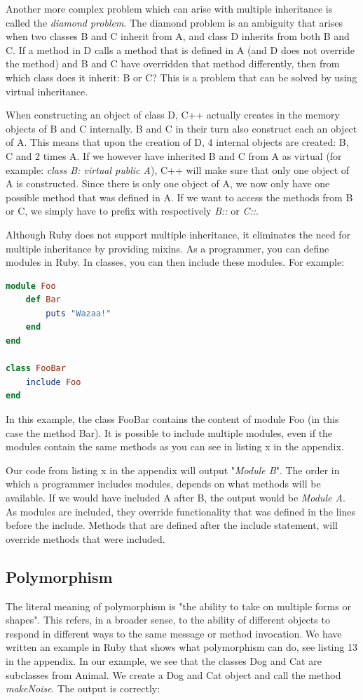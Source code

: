 \documentclass[10pt,a4paper,twocolumn]{article}
\begin{document}
Another more complex problem which can arise with multiple inheritance is called the \textit{diamond problem}. The diamond problem is an ambiguity that arises when two classes B and C inherit from A, and class D inherits from both B and C. If a method in D calls a method that is defined in A (and D does not override the method) and B and C have overridden that method differently, then from which class does it inherit: B or C? This is a problem that can be solved by using virtual inheritance.

When constructing an object of class D, C++ actually creates in the memory objects of B and C internally. B and C in their turn also construct each an object of A. This means that upon the creation of D, 4 internal objects are created: B, C and 2 times A. If we however have inherited B and C from A as virtual (for example: \textit{class B: virtual public A}), C++ will make sure that only one object of A is constructed. Since there is only one object of A, we now only have one possible method that was defined in A. If we want to access the methods from B or C, we simply have to prefix with respectively \textit{B::} or \textit{C::}.

Although Ruby does not support multiple inheritance, it eliminates the need for multiple inheritance by providing mixins. As a programmer, you can define modules in Ruby. In classes, you can then include these modules. For example:

\begin{lstlisting}[language=Ruby]
module Foo
	def Bar
		puts "Wazaa!"
	end
end

class FooBar
	include Foo
end
\end{lstlisting}

In this example, the class FooBar contains the content of module Foo (in this case the method Bar). It is possible to include multiple modules, even if the modules contain the same methods as you can see in listing x in the appendix.

Our code from listing x in the appendix will output "\textit{Module B}". The order in which a programmer includes modules, depends on what methods will be available. If we would have included A after B, the output would be \textit{Module A}. As modules are included, they override functionality that was defined in the lines before the include. Methods that are defined after the include statement, will override methods that were included.

\subsection{Polymorphism}
The literal meaning of polymorphism is "the ability to take on multiple forms or shapes". This refers, in a broader sense, to the ability of different objects to respond in different ways to the same message or method invocation. We have written an example in Ruby that shows what polymorphism can do, see listing 13 in the appendix. In our example, we see that the classes Dog and Cat are subclasses from Animal. We create a Dog and Cat object and call the method \textit{makeNoise}. The output is correctly:
\end{document}
